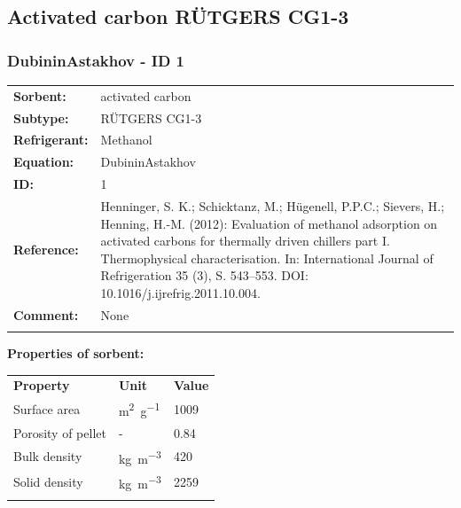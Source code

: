 \subsection{Activated carbon RÜTGERS CG1-3}
%
\subsubsection{DubininAstakhov - ID 1}
%
\begin{tabular}[l]{|lp{11.5cm}|}
\hline
\addlinespace

\textbf{Sorbent:} & activated carbon \\
\textbf{Subtype:} & RÜTGERS CG1-3 \\
\textbf{Refrigerant:} & Methanol \\
\textbf{Equation:} & DubininAstakhov \\
\textbf{ID:} & 1 \\
\textbf{Reference:} & Henninger, S. K.; Schicktanz, M.; Hügenell, P.P.C.; Sievers, H.; Henning, H.-M. (2012): Evaluation of methanol adsorption on activated carbons for thermally driven chillers part I. Thermophysical characterisation. In: International Journal of Refrigeration 35 (3), S. 543–553. DOI: 10.1016/j.ijrefrig.2011.10.004. \\
\textbf{Comment:} & None \\

\addlinespace
\hline
\end{tabular}
\newline

\textbf{Properties of sorbent:}
\newline
%
\begin{longtable}[l]{lll}
\toprule
\addlinespace
\textbf{Property} & \textbf{Unit} & \textbf{Value} \\
\addlinespace
\midrule
\endhead
\bottomrule
\endfoot
\bottomrule
\endlastfoot
\addlinespace

Surface area & \si{\square\meter\per\gram} & 1009\\
Porosity of pellet & - & 0.84\\
Bulk density & \si{\kilogram\per\cubic\meter} & 420\\
Solid density & \si{\kilogram\per\cubic\meter} & 2259\\

\addlinespace\end{longtable}


